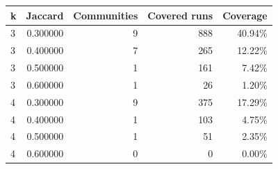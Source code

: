 \begin{tabular}{lrrrr}
\toprule
k & Jaccard & Communities & Covered runs & Coverage \\
\midrule
3 & 0.300000 & 9 & 888 & 40.94\% \\
3 & 0.400000 & 7 & 265 & 12.22\% \\
3 & 0.500000 & 1 & 161 & 7.42\% \\
3 & 0.600000 & 1 & 26 & 1.20\% \\
4 & 0.300000 & 9 & 375 & 17.29\% \\
4 & 0.400000 & 1 & 103 & 4.75\% \\
4 & 0.500000 & 1 & 51 & 2.35\% \\
4 & 0.600000 & 0 & 0 & 0.00\% \\
\bottomrule
\end{tabular}
